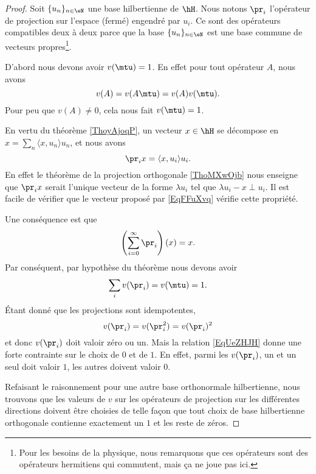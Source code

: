 \begin{proof}
    Soit \( \{ u_n \}_{n\in \eN}\) une base hilbertienne de \( \hH\). Nous notons \( \pr_i\) l'opérateur de projection sur l'espace (fermé) engendré par \( u_i\). Ce sont des opérateurs compatibles deux à deux parce que la base \( \{ u_n \}_{n\in \eN}\) est une base commune de vecteurs propres\footnote{Pour les besoins de la physique, nous remarquons que ces opérateurs sont des opérateurs hermitiens qui commutent, mais ça ne joue pas ici.}.

    D'abord nous devons avoir \( v(\mtu)=1\). En effet pour tout opérateur \( A\), nous avons
    \begin{equation}
        v(A)=v(A\mtu)=v(A)v(\mtu).
    \end{equation}
    Pour peu que \( v(A)\neq 0\), cela nous fait \( v(\mtu)=1\).

    En vertu du théorème \ref{ThoyAjoqP}, un vecteur \( x\in\hH\) se décompose en \( x=\sum_n\langle x, u_n\rangle u_n\), et nous avons
    \begin{equation}    \label{EqFFuXvq}
        \pr_ix=\langle x, u_i\rangle u_i.
    \end{equation}
    En effet le théorème de la projection orthogonale \ref{ThoMXwOjb} nous enseigne que \( \pr_ix\) serait l'unique vecteur de la forme \( \lambda u_i\) tel que \( \lambda u_i-x\perp u_i\). Il est facile de vérifier que le vecteur proposé par \eqref{EqFFuXvq} vérifie cette propriété.

    Une conséquence est que
    \begin{equation}
        \left( \sum_{i=0}^{\infty}\pr_i \right)(x)=x.
    \end{equation}
    Par conséquent, par hypothèse du théorème nous devons avoir
    \begin{equation}    \label{EqUeZHJH}
        \sum_iv(\pr_i)=v(\mtu)=1.
    \end{equation}
    Étant donné que les projections sont idempotentes,
    \begin{equation}
        v(\pr_i)=v(\pr_i^2)=v(\pr_i)^2
    \end{equation}
    et donc \( v(\pr_i)\) doit valoir zéro ou un. Mais la relation \eqref{EqUeZHJH} donne une forte contrainte sur le choix de \( 0\) et de \( 1\). En effet, parmi les \( v(\pr_i)\), un et un seul doit valoir \( 1\), les autres doivent valoir \( 0\).

    Refaisant le raisonnement pour une autre base orthonormale hilbertienne, nous trouvons que les valeurs de \( v\) sur les opérateurs de projection sur les différentes directions doivent être choisies de telle façon que tout choix de base hilbertienne orthogonale contienne exactement un \( 1\) et les reste de zéros.


\end{proof}
